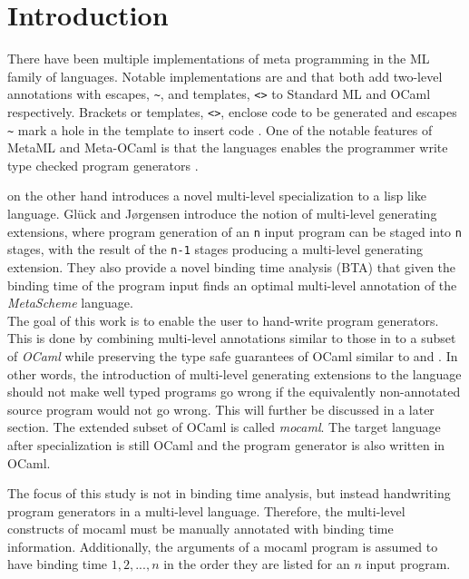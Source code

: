 \section{Introduction}
There have been multiple implementations of meta programming in the ML family of languages. Notable implementations are \cite{metaML} and \cite{metaOCaml} that both add two-level annotations with escapes, \texttt{\~}, and templates, \texttt{<>} to Standard ML and OCaml respectively. Brackets or templates, \texttt{<>}, enclose code to be generated and escapes \texttt{\~} mark a hole in the template to insert code \cite{metaOCaml}. One of the notable features of MetaML and Meta-OCaml is that the languages enables the programmer write type checked program generators \cite{metaOCaml}.

\cite{multilevel} on the other hand introduces a novel multi-level specialization
to a lisp like language. Glück and Jørgensen introduce the notion of multi-level generating extensions, where program generation of an \texttt{n} input program can be staged into \texttt{n} stages, with the result of the \texttt{n-1} stages producing a multi-level generating extension. They also provide a novel binding time analysis (BTA) that given the binding time of the program input finds an optimal multi-level annotation of the \textit{MetaScheme} language.\\

The goal of this work is to enable the user to hand-write program generators. This is done by combining multi-level annotations similar to those in \cite{multilevel} to a subset of \textit{OCaml} while preserving the type safe guarantees of OCaml similar to \cite{metaOCaml} and \cite{metaML}. In other words, the introduction of multi-level generating extensions to the language should not make well typed programs go wrong if the equivalently non-annotated source program would not go wrong. This will further be discussed in a later section. The extended subset of OCaml is called \textit{mocaml}. The target language after specialization is still OCaml and the program generator is also written in OCaml.

The focus of this study is not in binding time analysis, but instead handwriting program generators in a multi-level language. Therefore, the multi-level constructs of mocaml must be manually annotated with binding time information. Additionally, the arguments of a mocaml program is assumed to have binding time $1,2,...,n$ in the order they are listed for an $n$ input program.

